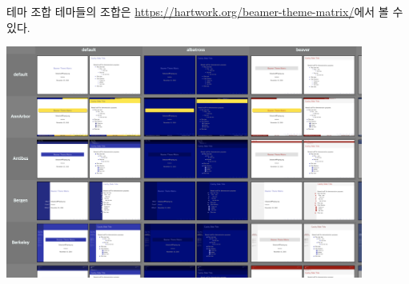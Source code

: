 \documentclass[compress]{beamer}
\begin{document}
\begin{frame}{테마 조합}
  테마들의 조합은 \url{https://hartwork.org/beamer-theme-matrix/}에서 볼 수
  있다.
  \begin{center}
    \includegraphics[width=0.88\textwidth]{figures/beamer-matrix}
  \end{center}
\end{frame}
\end{document}
